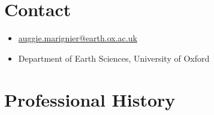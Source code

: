 \section{Contact}

\setlength{\parskip}{0pt}
\begin{itemize}[label={}, nosep]
    \item \href{mailto:auggie.marignier@earth.ox.ac.uk}{auggie.marignier@earth.ox.ac.uk}
    \item Department of Earth Sciences, University of Oxford
\end{itemize}


\section{Professional History}

